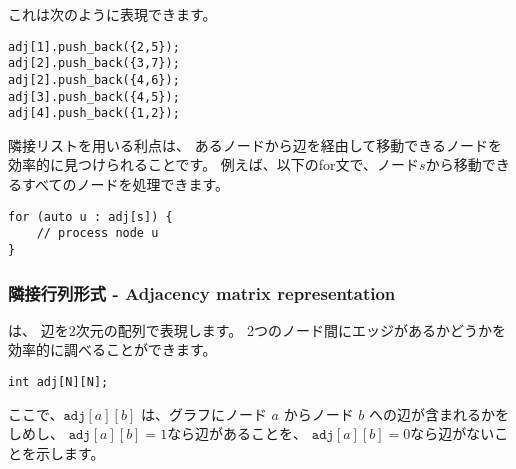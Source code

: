 \begin{center}
\end{center}
これは次のように表現できます。
\begin{lstlisting}
adj[1].push_back({2,5});
adj[2].push_back({3,7});
adj[2].push_back({4,6});
adj[3].push_back({4,5});
adj[4].push_back({1,2});
\end{lstlisting}


隣接リストを用いる利点は、
あるノードから辺を経由して移動できるノードを効率的に見つけられることです。
例えば、以下のfor文で、ノード$s$から移動できるすべてのノードを処理できます。

\begin{lstlisting}
for (auto u : adj[s]) {
    // process node u
}
\end{lstlisting}

\subsubsection{隣接行列形式 - Adjacency matrix representation}


は、
辺を2次元の配列で表現します。
2つのノード間にエッジがあるかどうかを効率的に調べることができます。
\begin{lstlisting}
int adj[N][N];
\end{lstlisting}
ここで、$\texttt{adj}[a][b]$ は、グラフにノード $a$ からノード $b$ への辺が含まれるかをしめし、
$\texttt{adj}[a][b]=1$なら辺があることを、
$\texttt{adj}[a][b]=0$なら辺がないことを示します。


